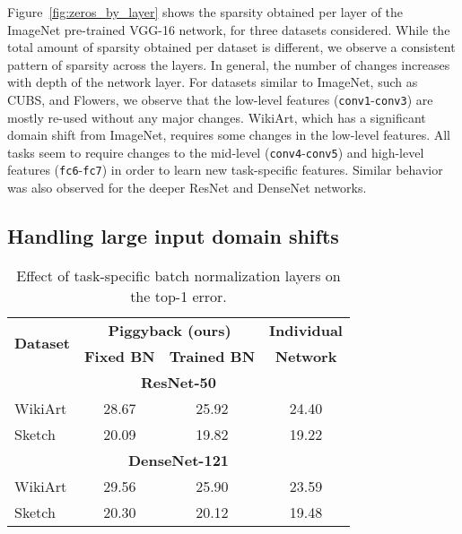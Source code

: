 \documentclass{llncs}
\begin{document}
Figure~\ref{fig:zeros_by_layer} shows the sparsity obtained per layer of the ImageNet pre-trained VGG-16 network, for three datasets considered. While the total amount of sparsity obtained per dataset is different, we observe a consistent pattern of sparsity across the layers. In general, the number of changes increases with depth of the network layer. For datasets similar to ImageNet, such as CUBS, and Flowers, we observe that the low-level features (\texttt{conv1}-\texttt{conv3}) are mostly re-used without any major changes. WikiArt, which has a significant domain shift from ImageNet, requires some changes in the low-level features. All tasks seem to require changes to the mid-level (\texttt{conv4}-\texttt{conv5}) and high-level features (\texttt{fc6}-\texttt{fc7}) in order to learn new task-specific features. Similar behavior was also observed for the deeper ResNet and DenseNet networks.



\subsection{Handling large input domain shifts}
\label{subsec:training_bn}

\begin{table}[b!]
  \centering
\begin{tabular}{l||c|c|c}
    \hline
    \multirow{2}{*}{\bf Dataset} & \multicolumn{2}{c|}{\bf Piggyback (ours)} & {\bf Individual} \\
    \cline{2-3}
    & {\bf Fixed BN} & {\bf Trained BN} & {\bf Network} \\\hline\hline
    \multicolumn{4}{c}{\bf ResNet-50} \\\hline
    WikiArt & 28.67 & 25.92 & 24.40 \\\hline Sketch & 20.09 & 19.82 & 19.22 \\\hline\hline
\multicolumn{4}{c}{\bf DenseNet-121} \\\hline
    WikiArt & 29.56 & 25.90 & 23.59 \\\hline Sketch & 20.30 & 20.12 & 19.48 \\\hline
\end{tabular}
\caption{Effect of task-specific batch normalization layers on the top-1 error.}
  \label{table:batchnorm}
\end{table}
\end{document}

